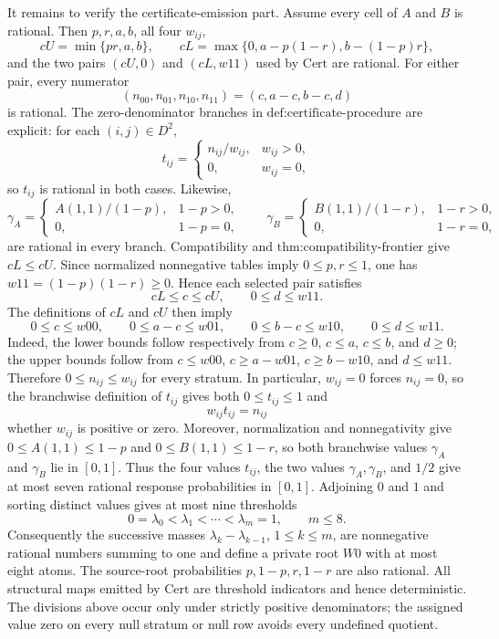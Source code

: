 It remains to verify the certificate-emission part.  Assume every cell of \(A\) and \(B\) is rational.  Then \(p,r,a,b\), all four \(w_{ij}\),
\[
cU=\min\{pr,a,b\},\qquad
cL=\max\{0,a-p(1-r),b-(1-p)r\},
\]
and the two pairs \((cU,0)\) and \((cL,w11)\) used by \(\mathrm{Cert}\) are rational.  For either pair, every numerator
\[
(n_{00},n_{01},n_{10},n_{11})=(c,a-c,b-c,d)
\]
is rational.  The zero-denominator branches in \(\text{def:certificate-procedure}\) are explicit: for each \((i,j)\in D^2\),
\[
t_{ij}=
\begin{cases}
n_{ij}/w_{ij},&w_{ij}>0,\\
0,&w_{ij}=0,
\end{cases}
\]
so \(t_{ij}\) is rational in both cases.  Likewise,
\[
\gamma_A=
\begin{cases}
A(1,1)/(1-p),&1-p>0,\\
0,&1-p=0,
\end{cases}
\qquad
\gamma_B=
\begin{cases}
B(1,1)/(1-r),&1-r>0,\\
0,&1-r=0,
\end{cases}
\]
are rational in every branch.  Compatibility and \(\text{thm:compatibility-frontier}\) give \(cL\le cU\).  Since normalized nonnegative tables imply \(0\le p,r\le1\), one has \(w11=(1-p)(1-r)\ge0\).  Hence each selected pair satisfies
\[
cL\le c\le cU,\qquad 0\le d\le w11.
\]
The definitions of \(cL\) and \(cU\) then imply
\[
0\le c\le w00,\qquad
0\le a-c\le w01,\qquad
0\le b-c\le w10,\qquad
0\le d\le w11.
\]
Indeed, the lower bounds follow respectively from \(c\ge0\), \(c\le a\), \(c\le b\), and \(d\ge0\); the upper bounds follow from \(c\le w00\), \(c\ge a-w01\), \(c\ge b-w10\), and \(d\le w11\).  Therefore \(0\le n_{ij}\le w_{ij}\) for every stratum.  In particular, \(w_{ij}=0\) forces \(n_{ij}=0\), so the branchwise definition of \(t_{ij}\) gives both \(0\le t_{ij}\le1\) and
\[
w_{ij}t_{ij}=n_{ij}
\]
whether \(w_{ij}\) is positive or zero.  Moreover, normalization and nonnegativity give \(0\le A(1,1)\le1-p\) and \(0\le B(1,1)\le1-r\), so both branchwise values \(\gamma_A\) and \(\gamma_B\) lie in \([0,1]\).  Thus the four values \(t_{ij}\), the two values \(\gamma_A,\gamma_B\), and \(1/2\) give at most seven rational response probabilities in \([0,1]\).  Adjoining \(0\) and \(1\) and sorting distinct values gives at most nine thresholds
\[
0=\lambda_0<\lambda_1<\cdots<\lambda_m=1,
\qquad m\le 8.
\]
Consequently the successive masses \(\lambda_k-\lambda_{k-1}\), \(1\le k\le m\), are nonnegative rational numbers summing to one and define a private root \(W0\) with at most eight atoms.  The source-root probabilities \(p,1-p,r,1-r\) are also rational.  All structural maps emitted by \(\mathrm{Cert}\) are threshold indicators and hence deterministic.  The divisions above occur only under strictly positive denominators; the assigned value zero on every null stratum or null row avoids every undefined quotient.

